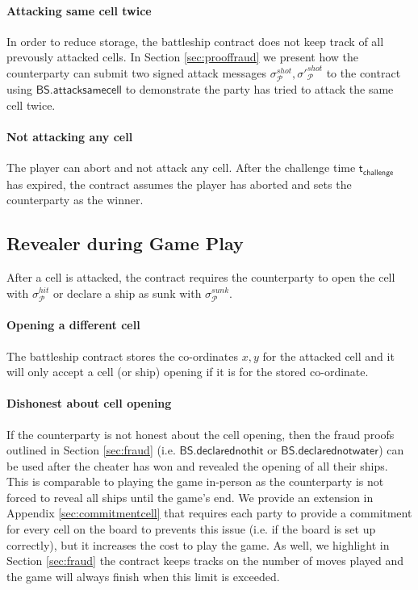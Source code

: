 \documentclass{llncs}
\newcommand{\participant}{\mathcal{P}}
\newcommand{\battleshipdeclarednothit}{\mathsf{BS.declarednothit}}
\newcommand{\battleshipdeclarednotwater}{\mathsf{BS.declarednotwater}}
\newcommand{\battleshipsamecell}{\mathsf{BS.attacksamecell}}
\newcommand{\timechallenge}{\mathsf{t}_{\mathsf{challenge}}}
\begin{document}
	\paragraph{Attacking same cell twice} 
	In order to reduce storage, the battleship contract does not keep track of all prevously attacked cells. 
	In Section \ref{sec:prooffraud} we present how the counterparty can submit two signed attack messages $\sigma^{shot}_{\participant},\sigma'^{shot}_{\participant}$ to the contract using $\battleshipsamecell$ to demonstrate the party has tried to attack the same cell twice. 
	
	\paragraph{Not attacking any cell} 
	The player can abort and not attack any cell. 
	After the challenge time $\timechallenge$ has expired, the contract assumes the player has aborted and sets the counterparty as the winner. 
	
	\subsection{Revealer during Game Play} 
	After a cell is attacked, the contract requires the counterparty to open the cell with $\sigma^{hit}_{\participant}$ or declare a ship as sunk with  $\sigma^{sunk}_{\participant}$.
	
	\paragraph{Opening a different cell}
	The battleship contract stores the co-ordinates $x,y$ for the attacked cell and it will only accept a cell (or ship) opening if it is for the stored co-ordinate. 
	
	\paragraph{Dishonest about cell opening}
	If the counterparty is not honest about the cell opening, then the fraud proofs outlined in Section \ref{sec:fraud} (i.e. $\battleshipdeclarednothit$ or $\battleshipdeclarednotwater$) can be used after the cheater has won and revealed the opening of all their ships. 
	This is comparable to playing the game in-person as the counterparty is not forced to reveal all ships until the game's end. 
	We provide an extension in Appendix \ref{sec:commitmentcell} that requires each party to provide a commitment for every cell on the board to prevents this issue (i.e. if the board is set up correctly), but it increases the cost to play the game. 
	As well, we highlight in Section \ref{sec:fraud} the contract keeps tracks on the number of moves played and the game will always finish when this limit is exceeded. 
	
\end{document}
